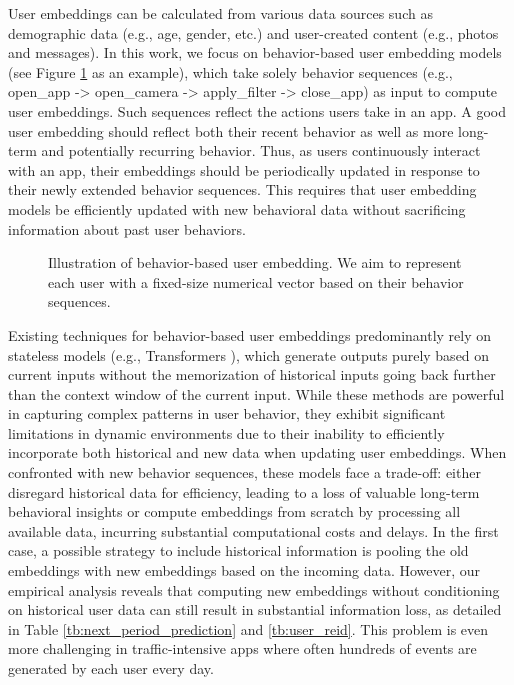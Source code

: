 \documentclass{article}
\begin{document}
User embeddings can be calculated from various data sources such as demographic data (e.g., age, gender, etc.) and user-created content (e.g., photos and messages). In this work, we focus on behavior-based user embedding models (see Figure \ref{fig:user_embedding} as an example), which take solely behavior sequences (e.g., open\_app -> open\_camera -> apply\_filter -> close\_app) as input to compute user embeddings. Such sequences reflect the actions users take in an app.  A good user embedding should reflect both their recent behavior as well as more long-term and potentially recurring behavior. Thus, as users continuously interact with an app, their embeddings should be periodically updated in response to their newly extended behavior sequences. 
This requires that user embedding models be efficiently updated with new behavioral data without sacrificing information about past user behaviors.


\begin{figure}
    \centering
		\caption{Illustration of behavior-based user embedding. We aim to represent each user with a fixed-size numerical vector based on their behavior sequences.}
    \label{fig:user_embedding}
\end{figure}

Existing techniques for behavior-based user embeddings  \citep{zhang_general-purpose_2020, pancha_pinnerformer_2022, chu_simcurl_2022} predominantly rely on stateless models (e.g., Transformers \citep{transformer}), which generate outputs purely based on current inputs without the memorization of historical inputs going back further than the context window of the current input. While these methods are powerful in capturing complex patterns in user behavior, they exhibit significant limitations in dynamic environments due to their inability to efficiently incorporate both historical and new data when updating user embeddings. When confronted with new behavior sequences, these models face a trade-off: either disregard historical data for efficiency, leading to a loss of valuable long-term behavioral insights or compute embeddings from scratch by processing all available data, incurring substantial computational costs and delays. In the first case, a possible strategy to include historical information is pooling the old embeddings with new embeddings based on the incoming data. However, our empirical analysis reveals that computing new embeddings without conditioning on historical user data can still result in substantial information loss, as detailed in Table \ref{tb:next_period_prediction} and \ref{tb:user_reid}. This problem is even more challenging in traffic-intensive apps where often hundreds of events are generated by each user every day. 
\end{document}
